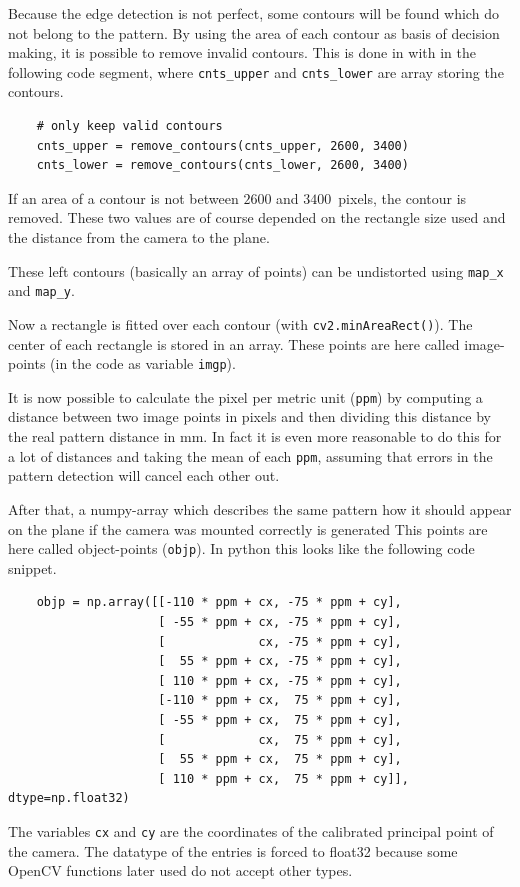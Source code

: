 Because the edge detection is not perfect, some contours will be found which do not belong to the pattern.
By using the area of each contour as basis of decision making, it is possible to remove invalid contours.
This is done in with in the following code segment, where \texttt{cnts\_upper} and \texttt{cnts\_lower} are array storing the contours.
\begin{lstlisting}
	# only keep valid contours
	cnts_upper = remove_contours(cnts_upper, 2600, 3400)
	cnts_lower = remove_contours(cnts_lower, 2600, 3400)
\end{lstlisting}
If an area of a contour is not between $2600$ and $3400\,$ pixels, the contour is removed.
These two values are of course depended on the rectangle size used and the distance from the camera to the plane.

These left contours (basically an array of points) can be undistorted using \texttt{map\_x} and \texttt{map\_y}.

Now a rectangle is fitted over each contour (with \texttt{cv2.minAreaRect()}).
The center of each rectangle is stored in an array.
These points are here called image-points (in the code as variable \texttt{imgp}).

It is now possible to calculate the pixel per metric unit (\texttt{ppm}) by computing a distance between two image points in pixels and then dividing this distance by the real pattern distance in mm.
In fact it is even more reasonable to do this for a lot of distances and taking the mean of each \texttt{ppm}, assuming that errors in the pattern detection will cancel each other out.

After that, a numpy-array which describes the same pattern how it should appear on the plane if the camera was mounted correctly is generated
This points are here called object-points (\texttt{objp}).
In python this looks like the following code snippet.
\begin{lstlisting}
	objp = np.array([[-110 * ppm + cx, -75 * ppm + cy],
	                 [ -55 * ppm + cx, -75 * ppm + cy],
	                 [             cx, -75 * ppm + cy],
	                 [  55 * ppm + cx, -75 * ppm + cy],
	                 [ 110 * ppm + cx, -75 * ppm + cy],
	                 [-110 * ppm + cx,  75 * ppm + cy],
	                 [ -55 * ppm + cx,  75 * ppm + cy],
	                 [             cx,  75 * ppm + cy],
	                 [  55 * ppm + cx,  75 * ppm + cy],
	                 [ 110 * ppm + cx,  75 * ppm + cy]], dtype=np.float32)
\end{lstlisting}
The variables \texttt{cx} and \texttt{cy} are the coordinates of the calibrated principal point of the camera.
The datatype of the entries is forced to float32 because some OpenCV functions later used do not accept other types.

